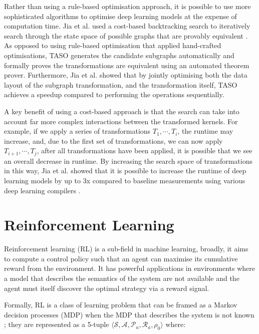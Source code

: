 
Rather than using a rule-based optimisation approach, it is possible to use more sophisticated algorithms to optimise deep learning models at the expense of computation time. Jia et al. used a cost-based backtracking search to iteratively search through the state space of possible graphs that are provably equivalent \cite{jia2019taso}. As opposed to using rule-based optimisation that applied hand-crafted optimisations, TASO generates the candidate subgraphs automatically and formally proves the transformations are equivalent using an automated theorem prover. Furthermore, Jia et al. showed that by jointly optimising both the data layout of the subgraph transformation, and the transformation itself, TASO achieves a speedup compared to performing the operations sequentially.

A key benefit of using a cost-based approach is that the search can take into account far more complex interactions between the transformed kernels. For example, if we apply a series of transformations $T_1, \cdots, T_i$, the runtime may increase, and, due to the first set of transformations, we can now apply $T_{i + 1}, \cdots, T_{j}$, after all transformations have been applied, it is possible that we see an overall decrease in runtime. By increasing the search space of transformations in this way, Jia et al. showed that it is possible to increase the runtime of deep learning models by up to 3x \cite{jia2019taso, jia2019optimizing} compared to baseline measurements using various deep learning compilers \cite{ chetlur2014cudnn, cublas2008, tensorrt2017}.


\section{Reinforcement Learning}
Reinforcement learning (RL) is a sub-field in machine learning, broadly, it aims to compute a control policy such that an agent can maximise its cumulative reward from the environment. It has powerful applications in environments where a model that describes the semantics of the system are not available and the agent must itself discover the optimal strategy via a reward signal.

Formally, RL is a class of learning problem that can be framed as a Markov decision processes (MDP) when the MDP that describes the system is not known \cite{bellman1957}; they are represented as a 5-tuple $\langle \mathcal{S}, \mathcal{A}, \mathcal{P}_a, \mathcal{R}_a, \rho_0 \rangle$ where:

